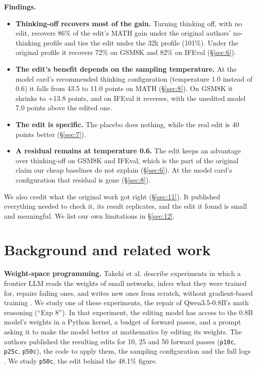 \documentclass[11pt]{article}
\begin{document}
\textbf{Findings.}

\begin{itemize}[nosep,leftmargin=*]
\item \textbf{Thinking-off recovers most of the gain.} Turning thinking off, with no edit, recovers 86\% of the edit's MATH gain under the original authors' no-thinking profile and ties the edit under the 32k profile (101\%). Under the original profile it recovers 72\% on GSM8K and 82\% on IFEval (\S\ref{sec:6}).
\item \textbf{The edit's benefit depends on the sampling temperature.} At the model card's recommended thinking configuration (temperature 1.0 instead of 0.6) it falls from 43.5 to 11.0 points on MATH (\S\ref{sec:8}). On GSM8K it shrinks to +13.8 points, and on IFEval it reverses, with the unedited model 7.0 points above the edited one.
\item \textbf{The edit is specific.} The placebo does nothing, while the real edit is 40 points better (\S\ref{sec:7}).
\item \textbf{A residual remains at temperature 0.6.} The edit keeps an advantage over thinking-off on GSM8K and IFEval, which is the part of the original claim our cheap baselines do not explain (\S\ref{sec:6}). At the model card's configuration that residual is gone (\S\ref{sec:8}).
\end{itemize}

We also credit what the original work got right (\S\ref{sec:11}). It published everything needed to check it, its result replicates, and the edit it found is small and meaningful. We list our own limitations in \S\ref{sec:12}.

\section{Background and related work}\label{sec:2}

\textbf{Weight-space programming.} Takehi et al. describe experiments in which a frontier LLM reads the weights of small networks, infers what they were trained for, repairs failing ones, and writes new ones from scratch, without gradient-based training \citep{takehi2026}. We study one of these experiments, the repair of Qwen3.5-0.8B's math reasoning (``Exp 8''). In that experiment, the editing model has access to the 0.8B model's weights in a Python kernel, a budget of forward passes, and a prompt asking it to make the model better at mathematics by editing its weights. The authors published the resulting edits for 10, 25 and 50 forward passes (\texttt{p10c}, \texttt{p25c}, \texttt{p50c}), the code to apply them, the sampling configuration and the full logs \citep{takehi2026logs}. We study \texttt{p50c}, the edit behind the 48.1\% figure.
\end{document}
